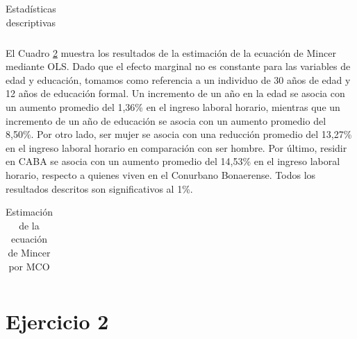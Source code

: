 \documentclass[11pt]{article}
\begin{document}
\begin{table}[H]
    \centering
    \caption[Estadísticas descriptivas]{Estadísticas descriptivas}
    \label{tab:sum_stats}
    \begin{adjustbox}{max width=\textwidth}
        \begin{tabular}{l*{2}{c}}
            
        \end{tabular}
    \end{adjustbox}
\end{table}

El Cuadro \ref{tab:OLS_mincer} muestra los resultados de la estimación de la ecuación de Mincer mediante OLS. Dado que el efecto marginal no es constante para las variables de edad y educación, tomamos como referencia a un individuo de 30 años de edad y 12 años de educación formal. Un incremento de un año en la edad se asocia con un aumento promedio del 1,36\% en el ingreso laboral horario, mientras que un incremento de un año de educación se asocia con un aumento promedio del 8,50\%. Por otro lado, ser mujer se asocia con una reducción promedio del 13,27\% en el ingreso laboral horario en comparación con ser hombre. Por último, residir en CABA se asocia con un aumento promedio del 14,53\% en el ingreso laboral horario, respecto a quienes viven en el Conurbano Bonaerense. Todos los resultados descritos son significativos al 1\%.
\begin{table}[H]
    \centering
    \caption[Estimación de la ecuación de Mincer por MCO y QR]{Estimación de la ecuación de Mincer por MCO}
    \label{tab:OLS_mincer}
    \begin{adjustbox}{max width=0.8\textwidth}
        \begin{tabular}{l*{2}{c}}
            
        \end{tabular}
    \end{adjustbox}
\end{table}


\section*{Ejercicio 2}
\end{document}
